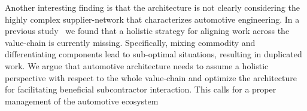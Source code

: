 
Another interesting finding is that the architecture is not clearly considering the highly complex supplier-network that characterizes automotive engineering. 
%
In a previous study~\cite{Soltani2015} %
we found that a holistic strategy for aligning work across the value-chain is currently missing. 
Specifically, mixing commodity and differentiating components lead to sub-optimal situations, resulting in duplicated work.  
We argue that automotive architecture needs to assume a holistic perspective with respect to the whole value-chain and optimize the architecture for facilitating beneficial subcontractor interaction. This calls for a proper management of the automotive ecosystem%
